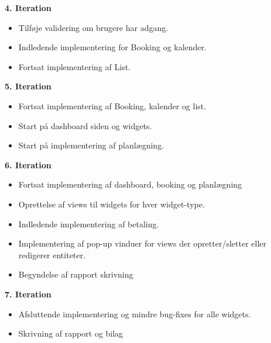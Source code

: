\textbf{4. Iteration}
\begin{itemize}
    \item Tilføje validering om brugere har adgang. 
    \item Indledende implementering for Booking og kalender.
    \item Fortsat implementering af List.
\end{itemize}

\textbf{5. Iteration}
\begin{itemize}
    \item Fortsat implementering af Booking, kalender og list.
    \item Start på dashboard siden og widgets.
    \item Start på implementering af planlægning.
\end{itemize}

\textbf{6. Iteration}
\begin{itemize}
    \item Fortsat implementering af dashboard, booking og planlægning
    \item Oprettelse af views til widgets for hver widget-type.
    \item Indledende implementering af betaling.
    \item Implementering af pop-up vinduer for views der opretter/sletter eller redigerer entiteter.
    \item Begyndelse af rapport skrivning
\end{itemize}

\textbf{7. Iteration}
\begin{itemize}
    \item Afsluttende implementering og mindre bug-fixes for alle widgets.
    \item Skrivning af rapport og bilag
\end{itemize}